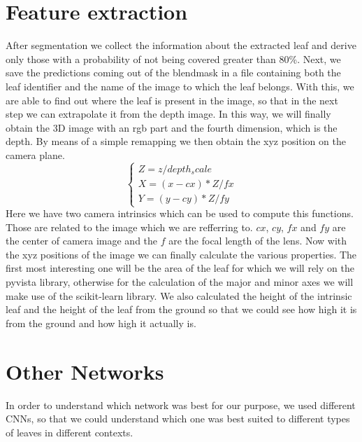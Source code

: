 \section{Feature extraction}
After segmentation we collect the information about the extracted leaf and derive only those with a probability of not being covered greater than 80\%.
Next, we save the predictions coming out of the blendmask in a file containing both the leaf identifier and the name of the image to which the leaf belongs.
With this, we are able to find out where the leaf is present in the image, so that in the next step we can extrapolate it from the depth image. In this way, we will
finally obtain the 3D image with an rgb part and the fourth dimension, which is the depth. By means of a simple remapping we then obtain the xyz position on the camera plane.
$$
\begin{cases}
    Z = z / depth_scale \\
    X = (x - cx) * Z / fx \\
    Y = (y - cy) * Z / fy
\end{cases}
$$
Here we have two camera intrinsics which can be used to compute this functions. Those are related to the image which we are refferring to. $cx$, $cy$, $fx$ and $fy$ are the 
center of camera image and the $f$ are the focal length of the lens. Now with the xyz positions of the image we can finally calculate the various properties. The first
most interesting one will be the area of the leaf for which we will rely on the pyvista library, otherwise for the calculation of the major and minor axes we will make
use of the scikit-learn library. We also calculated the height of the intrinsic leaf and the height of the leaf from the ground so that we could see how high it is from
the ground and how high it actually is.





\section{Other Networks}
In order to understand which network was best for our purpose, we used different CNNs, so that we could understand which one was best suited to different types of leaves
in different contexts.


